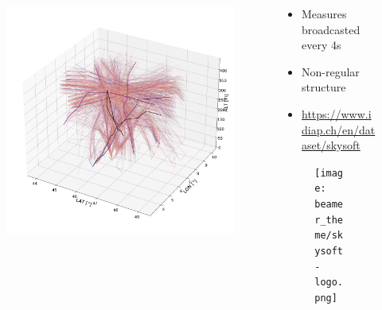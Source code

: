 \documentclass[aspectratio=169]{beamer}
\begin{document}
\begin{frame}
    \begin{columns}
        \begin{column}{0.5\textwidth}
            \begin{figure}[htbp]
                \includegraphics[height=0.83\textheight]{imgs/dataset.pdf}
            \end{figure}
        \end{column}
        \begin{column}{0.5\textwidth}
            \vspace{10pt}
            \begin{itemize}
                \item Measures broadcasted every 4s
                \item Non-regular structure
                \item \url{https://www.idiap.ch/en/dataset/skysoft}
            \end{itemize}
            \begin{figure}[htbp]
                \centering
                \texttt{[image: beamer\_theme/skysoft-logo.png]}
            \end{figure}
        \end{column}
    \end{columns}
\end{frame}
\end{document}
